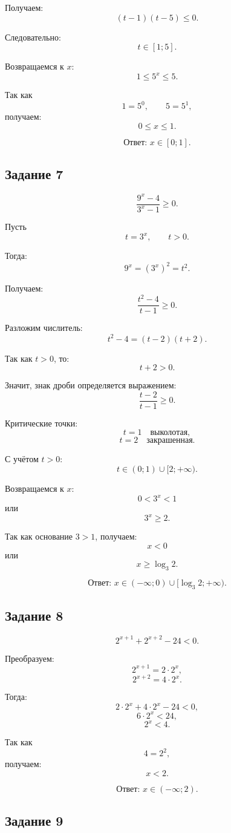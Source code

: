 \documentclass[a4paper,12pt]{article}
\newcommand{\answer}[1]{\textbf{Ответ: }#1}
\begin{document}
Получаем:
\[
(t-1)(t-5)\le0.
\]

Следовательно:
\[
t\in[1;5].
\]

Возвращаемся к \(x\):
\[
1\le5^x\le5.
\]

Так как
\[
1=5^0,\qquad 5=5^1,
\]
получаем:
\[
0\le x\le1.
\]

\[
\answer{\displaystyle x\in[0;1].}
\]

\subsection*{Задание 7}

\[
\frac{9^x-4}{3^x-1}\ge0.
\]

Пусть
\[
t=3^x,\qquad t>0.
\]

Тогда:
\[
9^x=(3^x)^2=t^2.
\]

Получаем:
\[
\frac{t^2-4}{t-1}\ge0.
\]

Разложим числитель:
\[
t^2-4=(t-2)(t+2).
\]

Так как \(t>0\), то:
\[
t+2>0.
\]

Значит, знак дроби определяется выражением:
\[
\frac{t-2}{t-1}\ge0.
\]

Критические точки:
\[
t=1 \quad \text{выколотая},
\]
\[
t=2 \quad \text{закрашенная}.
\]

С учётом \(t>0\):
\[
t\in(0;1)\cup[2;+\infty).
\]

Возвращаемся к \(x\):
\[
0<3^x<1
\]
или
\[
3^x\ge2.
\]

Так как основание \(3>1\), получаем:
\[
x<0
\]
или
\[
x\ge\log_3 2.
\]

\[
\answer{\displaystyle x\in(-\infty;0)\cup[\log_3 2;+\infty).}
\]

\subsection*{Задание 8}

\[
2^{x+1}+2^{x+2}-24<0.
\]

Преобразуем:
\[
2^{x+1}=2\cdot2^x,
\]
\[
2^{x+2}=4\cdot2^x.
\]

Тогда:
\[
2\cdot2^x+4\cdot2^x-24<0,
\]
\[
6\cdot2^x<24,
\]
\[
2^x<4.
\]

Так как
\[
4=2^2,
\]
получаем:
\[
x<2.
\]

\[
\answer{\displaystyle x\in(-\infty;2).}
\]

\subsection*{Задание 9}
\end{document}
